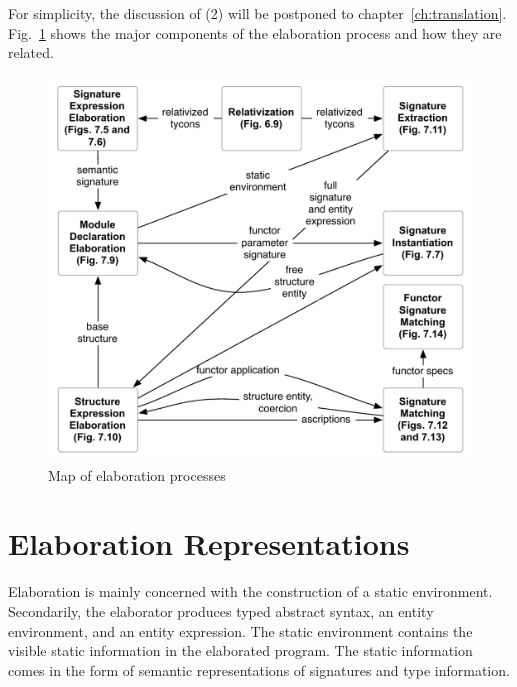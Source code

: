 \documentclass[9pt,nocopyrightspace, fleqn]{sigplanconf}
\begin{document}
For simplicity, the discussion of (2) will be postponed to chapter~\ref{ch:translation}. Fig.~\ref{fig:overview} shows the major components of the elaboration process and how they are related. 

\begin{figure}
\begin{center}
\includegraphics[scale=0.4]{../dissertation/figs/overview}
\end{center}
\caption{Map of elaboration processes}
\label{fig:overview}
\end{figure}
 


\section{Elaboration Representations}
Elaboration is mainly concerned with the construction of a static environment. Secondarily, the elaborator produces typed abstract syntax, an entity environment, and an entity expression. The static environment contains the visible static information in the elaborated program. The static information comes in the form of semantic representations of signatures and type information. 
\end{document}
